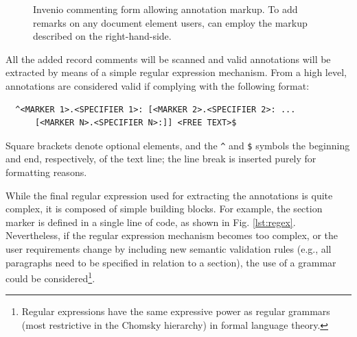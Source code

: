 \begin{figure}[!ht]
  \centering
  \caption[Invenio commenting form allowing annotation markup]
          {Invenio commenting form allowing annotation markup. To add remarks
           on any document element users, can employ the markup described on the
           right-hand-side.}
  \label{fig:noteform}
\end{figure}

All the added record comments will be scanned and valid annotations will be
extracted by means of a simple regular expression mechanism. From a high level,
annotations are considered valid if complying with the following format:
\begin{verbatim}
  ^<MARKER 1>.<SPECIFIER 1>: [<MARKER 2>.<SPECIFIER 2>: ...
      [<MARKER N>.<SPECIFIER N>:]] <FREE TEXT>$
\end{verbatim}
Square brackets denote optional elements, and the \texttt{\^} and \texttt{\$}
symbols the beginning and end, respectively, of the text line; the line break
is inserted purely for formatting reasons.

While the final regular expression used for extracting the annotations is quite
complex, it is composed of simple building blocks. For example, the section
marker is defined in a single line of code, as shown in Fig. \ref{lst:regex}.
Nevertheless, if the regular expression mechanism becomes too complex, or the
user requirements change by including new semantic validation rules (e.g., all
paragraphs need to be specified in relation to a section), the use of a grammar
could be considered\footnote{Regular expressions have the same expressive power
as regular grammars (most restrictive in the Chomsky hierarchy) in formal
language theory.}.

